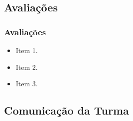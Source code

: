\subsection[Avaliações]{Avaliações}\label{subsec:planejamento-avaliacoes}



\begin{frame}[t]\frametitle{Avaliações}

  \begin{itemize}
    \justifying{}
    \setlength\itemsep{1em}
    \item Item 1.
    \item Item 2.
    \item Item 3.
  \end{itemize}

\end{frame}



\subsection[Comunicação da Turma]{Comunicação da Turma}\label{subsec:planejamento-comunicacao-turma}



